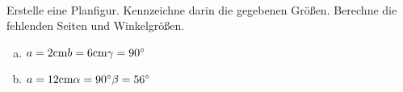 \begin{aufgabe} ~ \\ 
Erstelle eine Planfigur. Kennzeichne darin die gegebenen Größen. Berechne die fehlenden Seiten und Winkelgrößen.\begin{enumerate}[a)] 
\item 
$a=2 \mathrm{cm} \\b=6 \mathrm{cm} \\\gamma=90^{\circ} \\$
\item 
$a=12 \mathrm{cm} \\\alpha=90^{\circ} \\\beta=56^{\circ} \\$
\end{enumerate} 
\end{aufgabe} 
